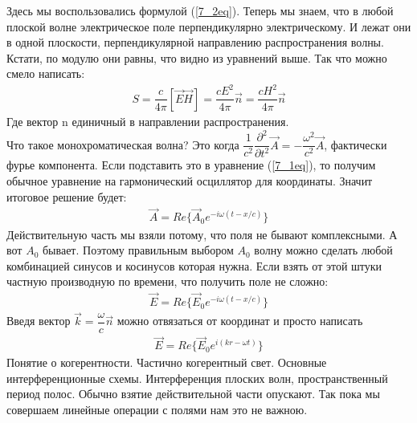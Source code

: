 	Здесь мы воспользовались формулой (\ref{7_2eq}). Теперь мы знаем, что в любой плоской волне электрическое поле перпендикулярно электрическому. И лежат они в одной плоскости, перпендикулярной направлению распространения волны. Кстати, по модулю они равны, что видно из уравнений выше. Так что можно смело написать:
	\begin{align*}
	S = \dfrac{c}{4\pi} [\vec{E} \vec{H}] = \dfrac{c E^2}{4\pi}\vec{n} = \dfrac{cH^2}{4\pi}\vec{n}
	\end{align*}
	Где вектор n единичный в направлении распространения. \\
	Что такое монохроматическая волна? Это когда $\dfrac{1}{c^2} \dfrac{\partial^2}{\partial t^2}\vec{A} =- \dfrac{\omega^2}{c^2} \vec{A}$, фактически фурье компонента. Если подставить это в уравнение (\ref{7_1eq}), то получим обычное уравнение на гармонический осциллятор для координаты. Значит итоговое решение будет:
	\begin{align*}
	\vec{A} = 	Re\{ \vec{A}_0 e^{-i \omega (t - x/c)}\}
	\end{align*}
	Действительную часть мы взяли потому, что поля не бывают комплексными. А вот $A_0$ бывает. Поэтому правильным выбором $A_0$ волну можно сделать любой комбинацией синусов и косинусов которая нужна. Если взять от этой штуки частную производную по времени, что получить поле не сложно:
	\begin{align*}
	\vec{E} = 	Re\{ \vec{E}_0 e^{-i \omega (t - x/c)}\}
	\end{align*}
	Введя вектор $\vec{k} = \dfrac{\omega}{c} \vec{n}$ можно отвязаться от координат и просто написать
	\begin{align*}
	\vec{E} = 	Re\{ \vec{E}_0 e^{i (kr - \omega t)}\}
	\end{align*}Понятие о когерентности. Частично когерентный свет. Основные интерференционные
	схемы. Интерференция плоских волн, пространственный период полос.
	Обычно взятие действительной части опускают. Так пока мы совершаем линейные операции с полями нам это не важною.  \\
